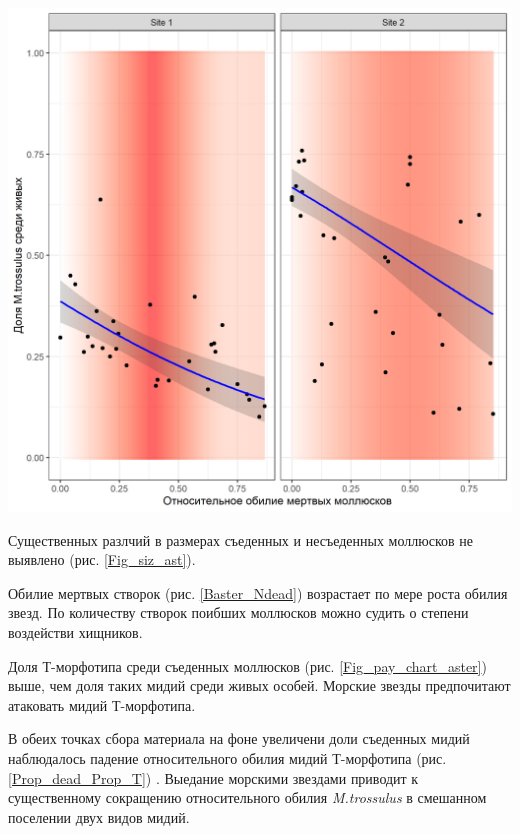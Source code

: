 \documentclass[a0,portrait]{a0poster}
\begin{document}
\begin{multicols}{2}
\begin{minipage}[t]{0.46\linewidth}
\begin{center}
			\includegraphics[width=0.9\linewidth]{Prop_dead_Prop_T.png}
			\label{Prop_dead_Prop_T}
		\end{center}
\end{minipage}\vspace{0.5cm}

\vspace{\belowdisplayskip}


Существенных разлчий в размерах съеденных и несъеденных моллюсков не выявлено (рис. \ref{Fig_siz_ast}). 

Обилие мертвых створок (рис. \ref{Baster_Ndead}) возрастает по мере роста обилия звезд. По количеству створок поибших моллюсков можно судить о степени воздействи хищников.  

Доля Т-морфотипа среди съеденных моллюсков (рис.  \ref{Fig_pay_chart_aster}) выше, чем доля таких мидий среди живых особей. Морские звезды предпочитают атаковать мидий Т-морфотипа. 

В обеих точках сбора материала на фоне увеличени доли съеденных мидий наблюдалось падение относительного обилия мидий Т-морфотипа (рис. \ref{Prop_dead_Prop_T}) . Выедание морскими звездами приводит к существенному сокращению относительного обилия \emph{M.trossulus} в смешанном поселении двух видов мидий.





\end{multicols}
\end{document}
